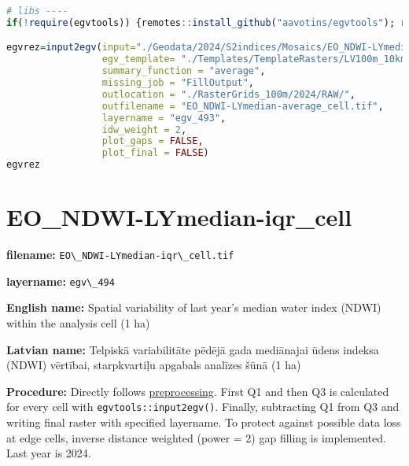 \documentclass[
]{book}
\newcommand{\passthrough}[1]{#1}
\begin{document}
\begin{lstlisting}[language=R]
# libs ----
if(!require(egvtools)) {remotes::install_github("aavotins/egvtools"); require(egvtools)}

egvrez=input2egv(input="./Geodata/2024/S2indices/Mosaics/EO_NDWI-LYmedian.tif",
                 egv_template= "./Templates/TemplateRasters/LV100m_10km.tif",
                 summary_function = "average",
                 missing_job = "FillOutput",
                 outlocation = "./RasterGrids_100m/2024/RAW/",
                 outfilename = "EO_NDWI-LYmedian-average_cell.tif",
                 layername = "egv_493",
                 idw_weight = 2,
                 plot_gaps = FALSE,
                 plot_final = FALSE)
egvrez
\end{lstlisting}

\section{EO\_NDWI-LYmedian-iqr\_cell}\label{ch06.494}

\textbf{filename:} \passthrough{\lstinline!EO\_NDWI-LYmedian-iqr\_cell.tif!}

\textbf{layername:} \passthrough{\lstinline!egv\_494!}

\textbf{English name:} Spatial variability of last year's median water index (NDWI) within the analysis cell (1 ha)

\textbf{Latvian name:} Telpiskā variabilitāte pēdējā gada mediānajai ūdens indeksa (NDWI) vērtībai, starpkvartiļu apgabals analīzes šūnā (1 ha)

\textbf{Procedure:} Directly follows \hyperref[Ch04.13]{preprocessing}. First Q1 and then Q3
is calculated for every cell with \passthrough{\lstinline!egvtools::input2egv()!}. Finally, subtracting
Q1 from Q3 and writing final raster with specified layername. To protect against possible data loss at edge cells,
inverse distance weighted (power = 2) gap filling is implemented. Last year is 2024.
\end{document}
